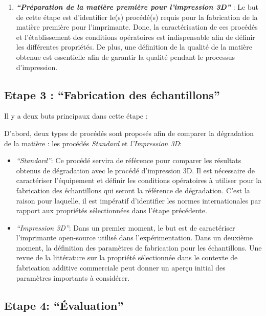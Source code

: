 \documentclass[
]{article}
\providecommand{\tightlist}{%
  \setlength{\itemsep}{0pt}\setlength{\parskip}{0pt}}
\begin{document}
\begin{enumerate}
\def\labelenumi{\arabic{enumi}.}
\setcounter{enumi}{1}
\tightlist
\item
  \textbf{\emph{``Préparation de la matière première pour l'impression 3D''}} :
  Le but de cette étape est d'identifier le(s) procédé(s) requis pour la fabrication de la matière première pour l'imprimante. Donc, la caractérisation de ces procédés et l'établissement des conditions opératoires est indispensable afin de définir les différentes propriétés.
  De plus, une définition de la qualité de la matière obtenue est essentielle afin de garantir la qualité pendant le processus d'impression.
\end{enumerate}

\hypertarget{etape-3-fabrication-des-uxe9chantillons}{%
\subsection{Etape 3 : ``Fabrication des échantillons''}\label{etape-3-fabrication-des-uxe9chantillons}}

Il y a deux buts principaux dans cette étape :

D'abord, deux types de procédés sont proposés afin de comparer la dégradation de la matière : les procédés \emph{Standard} et \emph{l'Impression 3D}:

\begin{itemize}
\item
  \emph{``Standard''}: Ce procédé servira de référence pour comparer les résultats obtenus de dégradation avec le procédé d'impression 3D. Il est nécessaire de caractériser l'équipement et définir les conditions opératoires à utiliser pour la fabrication des échantillons qui seront la référence de dégradation. C'est la raison pour laquelle, il est impératif d'identifier les normes internationales par rapport aux propriétés sélectionnées dans l'étape précédente.
\item
  \emph{``Impression 3D''}: Dans un premier moment, le but est de caractériser l'imprimante open-source utilisé dans l'expérimentation.
  Dans un deuxième moment, la définition des paramètres de fabrication pour les échantillons. Une revue de la littérature sur la propriété sélectionnée dans le contexte de fabrication additive commerciale peut donner un aperçu initial des paramètres importants à considérer.
\end{itemize}

\hypertarget{Step4}{%
\subsection{Etape 4: ``Évaluation''}\label{Step4}}
\end{document}
